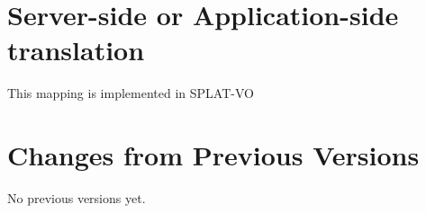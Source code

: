 \documentclass[11pt,a4paper]{ivoa}
\begin{document}
\section{Server-side or Application-side translation}
This mapping is implemented in SPLAT-VO


\appendix
\section{Changes from Previous Versions}

No previous versions yet.  



\end{document}
